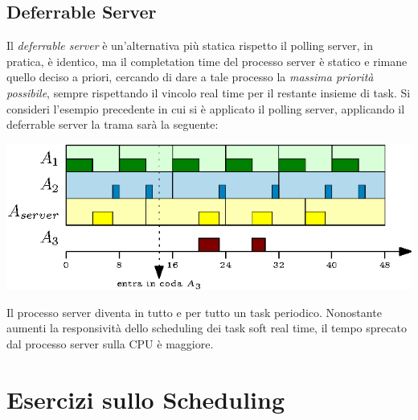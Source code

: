 \documentclass[10pt, letterpaper]{report}
\begin{document}
\subsection{Deferrable Server}
Il \textit{deferrable server} è un'alternativa più statica rispetto il polling server, in pratica, è identico, ma il completation time del processo server è statico e rimane quello deciso a priori, cercando di dare a tale processo la \textit{massima priorità possibile}, sempre rispettando il vincolo real time per il restante insieme di task. Si consideri l'esempio precedente in cui si è applicato il polling server, applicando il deferrable server la trama sarà la seguente:
\begin{center}
    \includegraphics[width=1\textwidth ]{images/deferrableServer.eps}
\end{center}
Il processo server diventa in tutto e per tutto un task periodico. Nonostante aumenti la responsività dello scheduling dei task soft real time, il tempo sprecato dal processo server sulla CPU è maggiore.\flowerLine 
\section{Esercizi sullo Scheduling}
\end{document}
